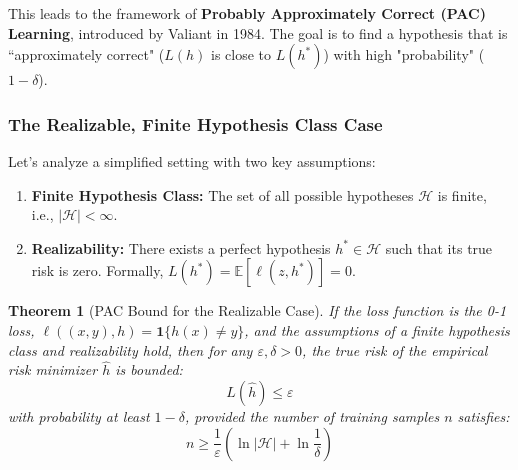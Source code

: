 \documentclass[11pt]{article}
\theoremstyle{plain} %
\newtheorem{theorem}{Theorem}[section] %
\begin{document}
This leads to the framework of \textbf{Probably Approximately Correct (PAC) Learning}, introduced by Valiant in 1984. The goal is to find a hypothesis that is “approximately correct" ($L(h)$ is close to $L(h^*)$) with high "probability" ($1-\delta$).

\subsubsection{The Realizable, Finite Hypothesis Class Case}
Let's analyze a simplified setting with two key assumptions:
\begin{enumerate}
    \item \textbf{Finite Hypothesis Class:} The set of all possible hypotheses $\mathcal{H}$ is finite, i.e., $|\mathcal{H}| < \infty$.
    \item \textbf{Realizability:} There exists a perfect hypothesis $h^* \in \mathcal{H}$ such that its true risk is zero. Formally, $L(h^*) = \mathbb{E}[\ell(z,h^*)] = 0$.
\end{enumerate}

\begin{theorem}[PAC Bound for the Realizable Case]
\label{thm:pac_realizable}
If the loss function is the 0-1 loss, $\ell((x,y),h) = \mathbf{1}\{h(x) \neq y\}$, and the assumptions of a finite hypothesis class and realizability hold, then for any $\varepsilon, \delta > 0$, the true risk of the empirical risk minimizer $\hat{h}$ is bounded:
\[ L(\hat{h}) \leq \varepsilon \]
with probability at least $1-\delta$, provided the number of training samples $n$ satisfies:
\[ n \geq \frac{1}{\varepsilon}\left(\ln|\mathcal{H}| + \ln\frac{1}{\delta}\right) \]
\end{theorem}
\end{document}

